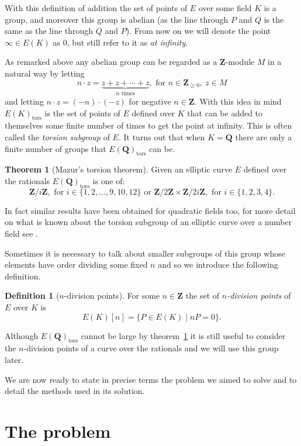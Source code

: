 \documentclass[12pt,a4paper,abstracton,bibtotoc]{scrreprt}
\theoremstyle{definition}
\newtheorem{thm}{Theorem}
\newtheorem{defn}{Definition}
\newcommand{\QQ}{\mathbf{Q}}
\newcommand{\ZZ}{\mathbf{Z}}
\begin{document}
With this definition of addition the set of points of $E$ over some field $K$ is a group, and moreover this group is abelian (as the line through $P$ and $Q$ is the same as the line through $Q$ and $P$).
From now on we will denote the point $\infty\in E(K)$ as $0$, but still refer to it as \emph{at infinity}.

As remarked above any abelian group can be regarded as a $\ZZ$-module $M$ in a natural way by letting 
\[n\cdot z = \underbrace{z + z + \cdots + z}_\text{$n$ times},\text{ for } n\in\ZZ_{\ge 0},\ z\in M\]
and letting $n\cdot z = (-n)\cdot(-z)$ for negative $n\in \ZZ$.
With this idea in mind $E(K)_\text{tors}$ is the set of points of $E$ defined over $K$ that can be added to themselves some finite number of times to get the point at infinity.
This is often called the \emph{torsion subgroup} of $E$.
It turns out that when $K = \QQ$ there are only a finite number of groups that $E(\QQ)_\text{tors}$ can be.

\begin{thm}[Mazur's torsion theorem]
\label{thm:tors}
Given an elliptic curve $E$ defined over the rationals $E(\QQ)_\text{tors}$ is one of:
\[
\ZZ/i\ZZ,\text{ for } i \in\{1,2,\ldots,9,10,12\}\text{ or }
\ZZ/2\ZZ \times \ZZ/2i\ZZ,\text{ for } i \in\{1,2,3,4\}.
\]
\end{thm}

In fact similar results have been obtained for quadratic fields too, for more detail on what is known about the torsion subgroup of an elliptic curve over a number field see \cite{sutherland}.

Sometimes it is necessary to talk about smaller subgroups of this group whose elements have order dividing some fixed $n$ and so we introduce the following definition.
\begin{defn}[$n$-division points]
For some $n\in\ZZ$ the set of \emph{$n$-division points} of $E$ over $K$ is
\[
E(K)[n] = \{P\in E(K) \mid nP = 0\}.
\]
\end{defn}
Although $E(\QQ)_\text{tors}$ cannot be large by theorem~\ref{thm:tors} it is still useful to consider the $n$-division points of a curve over the rationals and we will use this group later.

\minisec{}
We are now ready to state in precise terms the problem we aimed to solve and to detail the methods used in its solution.


\chapter{The problem}
\label{chap:prob}
\end{document}
